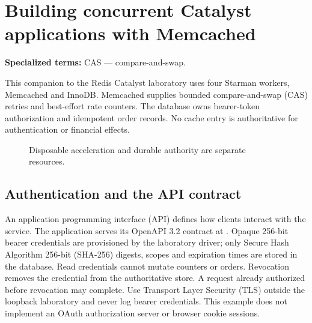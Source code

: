 \chapter{Building concurrent Catalyst applications with Memcached}
\label{ch:memcached-capstone}
\par\smallskip\noindent\textbf{Specialized terms:} CAS --- compare-and-swap.\par\smallskip

This companion to the Redis Catalyst laboratory uses four Starman workers, Memcached and InnoDB. Memcached supplies bounded compare-and-swap (CAS) retries and best-effort rate counters. The database owns bearer-token authorization and idempotent order records. No cache entry is authoritative for authentication or financial effects.

\begin{figure}[H]\centering
{}
\caption{Disposable acceleration and durable authority are separate resources.}
\end{figure}

\section{Authentication and the API contract}
An application programming interface (API) defines how clients interact with the service. The application serves its OpenAPI 3.2 contract at . Opaque 256-bit bearer credentials are provisioned by the laboratory driver; only Secure Hash Algorithm 256-bit (SHA-256) digests, scopes and expiration times are stored in the database. Read credentials cannot mutate counters or orders. Revocation removes the credential from the authoritative store. A request already authorized before revocation may complete. Use Transport Layer Security (TLS) outside the loopback laboratory and never log bearer credentials. This example does not implement an OAuth authorization server or browser cookie sessions.


